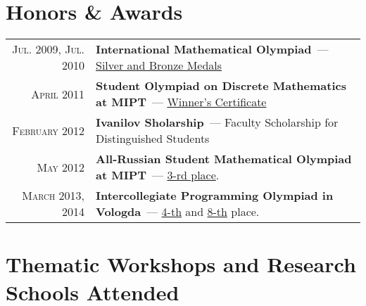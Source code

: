 \documentclass[a4paper,10pt]{article} %
\begin{document}
\vfill


\section{Honors \& Awards}

\begin{tabular}{rl}
\textsc{Jul.} 2009, \textsc{Jul.} 2010 & \textbf{International Mathematical Olympiad}~--- \href{https://www.imo-official.org/participant_r.aspx?id=18778&column=year&order=desc&language=en}{Silver and Bronze Medals} \\

\textsc{April} 2011 & \textbf{Student Olympiad on Discrete Mathematics at MIPT}~--- \href{https://mipt.ru/dcam/news/n_50milb}{Winner's Certificate}\\
\textsc{February} 2012 & \textbf{Ivanilov Sholarship}~--- Faculty Scholarship for Distinguished Students \\

\textsc{May} 2012 & \textbf{All-Russian Student Mathematical Olympiad at MIPT}~--- \href{http://www.rkarasev.ru/note/22}{3-rd place}. \\

\textsc{March} 2013, 2014 & \textbf{Intercollegiate Programming Olympiad in Vologda}~--- \href{http://olympiads.vologda-uni.ru/interuni/2013.htm}{4-th} and \href{http://olympiads.vologda-uni.ru/interuni/2014.htm}{8-th} place.

\end{tabular}

\vfill

\newpage

\vspace{1.2cm}

\section{Thematic Workshops and Research Schools Attended}
\end{document}
